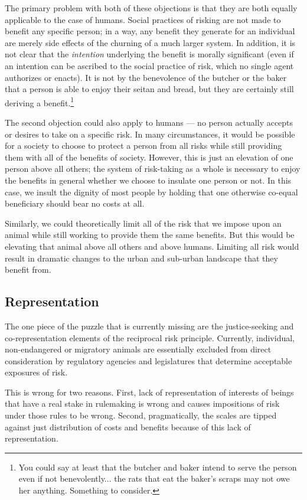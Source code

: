 \documentclass[12pt]{article}
\begin{document}
The primary problem with both of these objections is that they are both equally
applicable to the case of humans. Social practices of risking are not made to
benefit any specific person; in a way, any benefit they generate for an
individual are merely side effects of the churning of a much larger system. In
addition, it is not clear that the \emph{intention} underlying the benefit is
morally significant (even if an intention can be ascribed to the social
practice of risk, which no single agent authorizes or enacts). It is not by the
benevolence of the butcher or the baker that a person is able to enjoy their
seitan and bread, but they are certainly still deriving a benefit.\footnote{You
could say at least that the butcher and baker intend to serve the person even
if not benevolently... the rats that eat the baker’s scraps may not owe her
anything. Something to consider.}

The second objection could also apply to humans --- no person actually accepts
or desires to take on a specific risk. In many circumstances, it would be
possible for a society to choose to protect a person from all risks while still
providing them with all of the benefits of society. However, this is just an
elevation of one person above all others; the system of risk-taking as a whole
is necessary to enjoy the benefits in general whether we choose to insulate one
person or not. In this case, we insult the dignity of most people by holding
that one otherwise co-equal beneficiary should bear no costs at all.

Similarly, we could theoretically limit all of the risk that we impose upon an
animal while still working to provide them the same benefits. But this would be
elevating that animal above all others and above humans. Limiting all risk
would result in dramatic changes to the urban and sub-urban landscape that they
benefit from.

\subsection{Representation}

The one piece of the puzzle that is currently missing are the justice-seeking
and co-representation elements of the reciprocal risk principle. Currently,
individual, non-endangered or migratory animals are essentially excluded from
direct consideration by regulatory agencies and legislatures that determine
acceptable exposures of risk.

This is wrong for two reasons. First, lack of representation of interests of
beings that have a real stake in rulemaking is wrong and causes impositions of
risk under those rules to be wrong. Second, pragmatically, the scales are
tipped against just distribution of costs and benefits because of this lack of
representation.
\end{document}
